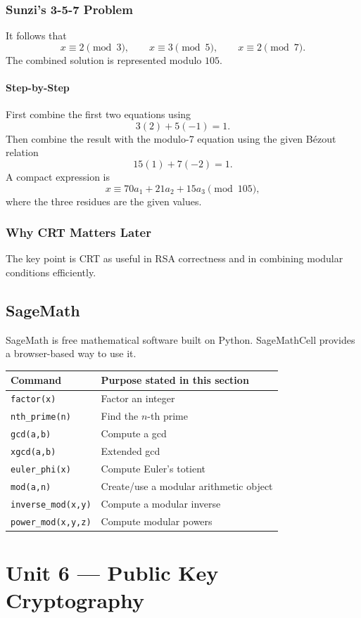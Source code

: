 \documentclass[12pt]{article}
\newcommand{\Step}{\paragraph{Step-by-Step}}
\begin{document}
\subsubsection{Sunzi's 3-5-7 Problem}
It follows that
\[
x\equiv2\pmod3,\qquad x\equiv3\pmod5,\qquad x\equiv2\pmod7.
\]
The combined solution is represented modulo $105$.

\Step
First combine the first two equations using
\[
3(2)+5(-1)=1.
\]
Then combine the result with the modulo-7 equation using the given Bézout relation
\[
15(1)+7(-2)=1.
\]
A compact expression is
\[
x\equiv70a_1+21a_2+15a_3\pmod{105},
\]
where the three residues are the given values.

\subsubsection{Why CRT Matters Later}
The key point is CRT as useful in RSA correctness and in combining modular conditions efficiently.

\subsection{SageMath}
SageMath is free mathematical software built on Python. SageMathCell provides a browser-based way to use it.

\begin{table}[H]
\centering
\begin{tabularx}{\textwidth}{lX}
\toprule
Command & Purpose stated in this section\\
\midrule
\verb|factor(x)| & Factor an integer\\
\verb|nth_prime(n)| & Find the $n$-th prime\\
\verb|gcd(a,b)| & Compute a gcd\\
\verb|xgcd(a,b)| & Extended gcd\\
\verb|euler_phi(x)| & Compute Euler's totient\\
\verb|mod(a,n)| & Create/use a modular arithmetic object\\
\verb|inverse_mod(x,y)| & Compute a modular inverse\\
\verb|power_mod(x,y,z)| & Compute modular powers\\
\bottomrule
\end{tabularx}
\end{table}

\newpage
\section{Unit 6 --- Public Key Cryptography}
\end{document}
